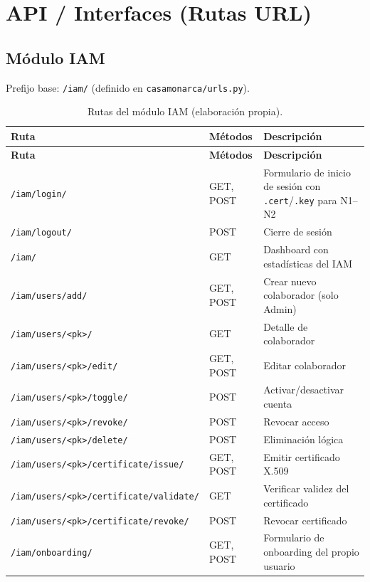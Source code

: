 \documentclass[10pt,letterpaper]{report}
\begin{document}
\chapter{API / Interfaces (Rutas URL)}

\section{Módulo IAM}

Prefijo base: \texttt{/iam/} (definido en \texttt{casamonarca/urls.py}).

\begin{longtable}{l l p{4.5cm}}
\caption{Rutas del módulo IAM (elaboración propia).}
\label{tab:routes_iam}\\
\toprule
\textbf{Ruta} & \textbf{Métodos} & \textbf{Descripción} \\
\midrule
\endfirsthead
\toprule
\textbf{Ruta} & \textbf{Métodos} & \textbf{Descripción} \\
\midrule
\endhead
\bottomrule
\endfoot
\texttt{/iam/login/} & GET, POST & Formulario de inicio de sesión con \texttt{.cert}/\texttt{.key} para N1--N2 \\
\texttt{/iam/logout/} & POST & Cierre de sesión \\
\texttt{/iam/} & GET & Dashboard con estadísticas del IAM \\
\texttt{/iam/users/add/} & GET, POST & Crear nuevo colaborador (solo Admin) \\
\texttt{/iam/users/<pk>/} & GET & Detalle de colaborador \\
\texttt{/iam/users/<pk>/edit/} & GET, POST & Editar colaborador \\
\texttt{/iam/users/<pk>/toggle/} & POST & Activar/desactivar cuenta \\
\texttt{/iam/users/<pk>/revoke/} & POST & Revocar acceso \\
\texttt{/iam/users/<pk>/delete/} & POST & Eliminación lógica \\
\texttt{/iam/users/<pk>/certificate/issue/} & GET, POST & Emitir certificado X.509 \\
\texttt{/iam/users/<pk>/certificate/validate/} & GET & Verificar validez del certificado \\
\texttt{/iam/users/<pk>/certificate/revoke/} & POST & Revocar certificado \\
\texttt{/iam/onboarding/} & GET, POST & Formulario de onboarding del propio usuario \\

\end{longtable}
\end{document}
